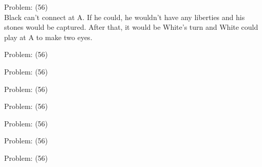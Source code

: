 \documentclass[11pt]{article}
\begin{document}
\begin{minipage}[t]{0.5\textwidth}
  {\centering
  
Problem: (56)\\
Black can't connect at A. If he could, he wouldn't have any liberties and his stones would be captured. After that, it would be White’s turn and White could play at A to make two eyes.\\
  }
\end{minipage}
\begin{minipage}[t]{0.5\textwidth}
  {\centering
  
Problem: (56)\\
  }
\end{minipage}
\begin{minipage}[t]{0.5\textwidth}
  {\centering
  
Problem: (56)\\
  }
\end{minipage}
\begin{minipage}[t]{0.5\textwidth}
  {\centering
  
Problem: (56)\\
  }
\end{minipage}
\begin{minipage}[t]{0.5\textwidth}
  {\centering
  
Problem: (56)\\
  }
\end{minipage}
\begin{minipage}[t]{0.5\textwidth}
  {\centering
  
Problem: (56)\\
  }
\end{minipage}
\begin{minipage}[t]{0.5\textwidth}
  {\centering
  
Problem: (56)\\
  }
\end{minipage}
\begin{minipage}[t]{0.5\textwidth}
  {\centering
  
Problem: (56)\\
  }
\end{minipage}
\end{document}
